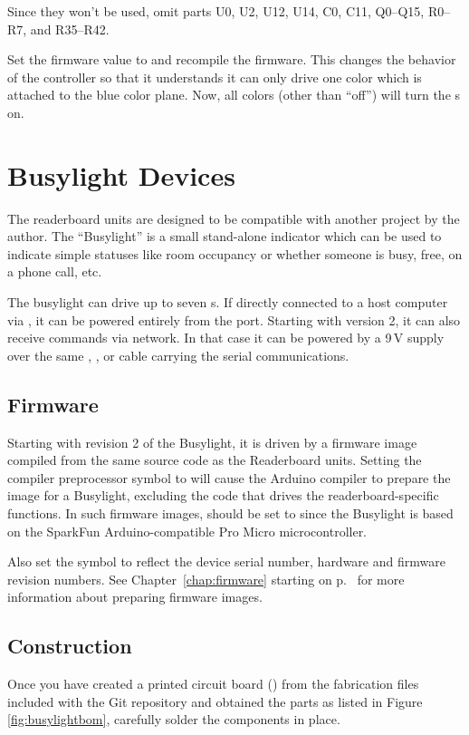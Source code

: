 Since they won't be used, omit parts U0, U2, U12, U14, C0, C11, Q0--Q15, R0--R7, and R35--R42.

Set the firmware value  to  and recompile the firmware. This
changes the behavior of the controller so that it understands it can only drive one color which
is attached to the blue color plane. Now, all colors (other than ``off'') will turn the \led s
on.

\section{Busylight Devices}
The readerboard units are designed to be compatible with another project by the author. The ``Busylight''
is a small stand-alone indicator which can be used to indicate simple statuses like room occupancy or
whether someone is busy, free, on a phone call, etc.

The busylight can drive up to seven \led s. If directly connected to a host computer
via , it can be powered entirely from the  port. Starting with version 2,
it can also receive commands via  network. In that case it can be powered by a 9\,V
supply over the same , , or  cable carrying the serial
communications.

\subsection{Firmware}
Starting with revision 2 of the Busylight, it is driven by a firmware image compiled from the same
source code as the Readerboard units. Setting the compiler preprocessor symbol
 to  will cause the Arduino compiler to prepare the image
for a Busylight, excluding the code that drives the readerboard-specific functions.
In such firmware images,  should be set to  since the Busylight is
based on the SparkFun Arduino-compatible Pro Micro microcontroller.

Also set the  symbol to reflect the device serial number, hardware and firmware
revision numbers. See Chapter~\ref{chap:firmware} starting on p.~\pageref{chap:firmware} for more information
about preparing firmware images.

\subsection{Construction}
Once you have created a printed circuit board () from the fabrication
files included with the Git repository and obtained the parts
as listed in Figure \ref{fig:busylightbom}, carefully solder the components in place.

